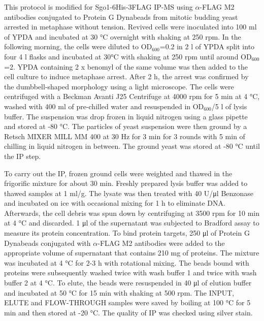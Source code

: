This protocol is modified for Sgo1-6His-3FLAG IP-MS using $\alpha$-FLAG M2 antibodies conjugated to Protein G Dynabeads from mitotic budding yeast arrested in metaphase without tension. Revived cells were inoculated into 100 \si{\milli\litre} of YPDA and incubated at 30 \si{\celsius} overnight with shaking at 250 rpm. In the following morning, the cells were diluted to OD$_{600}$=0.2 in 2 \si{\litre} of YPDA split into four 4 \si{\litre} flasks and incubated at 30\si{\celsius} with shaking at 250 rpm until around OD$_{600}$=2. YPDA containing 2 x benomyl of the same volume was then added to the cell culture to induce metaphase arrest. After 2 \si{\hour}, the arrest was confirmed by the dumbbell-shaped morphology using a light microscope. The cells were centrifuged with a Beckman Avanti J25 Centrifuge at 4000 rpm for 5 \si{\minute} at 4 \si{\celsius}, washed with 400 \si{\milli\litre} of pre-chilled water and resuspended in OD$_{600}$/5 \si{\litre} of lysis buffer. The suspension was drop frozen in liquid nitrogen using a glass pipette and stored at -80 \si{\celsius}. The particles of yeast suspension were then ground by a Retsch MIXER MILL MM 400 at 30 \si{\hertz} for 3 \si{\minute} for 3 rounds with 5 \si{\minute} of chilling in liquid nitrogen in between. The ground yeast was stored at -80 \si{\celsius} until the IP step. 

To carry out the IP, frozen ground cells were weighted and thawed in the frigorific mixture for about 30 \si{\minute}. Freshly prepared lysis buffer was added to thawed samples at 1 \si{\milli\litre/\gram}. The lysate was then treated with 40 U/\si{\micro\litre} Benzonase and incubated on ice with occasional mixing for 1 \si{\hour} to eliminate DNA. Afterwards, the cell debris was spun down by centrifuging at 3500 rpm for 10 \si{\minute} at 4 \si{\celsius} and discarded. 1 \si{\micro\litre} of the supernatant was subjected to Bradford assay to measure its protein concentration. To bind protein targets, 250 \si{\micro\litre} of Protein G Dynabeads conjugated with $\alpha$-FLAG M2 antibodies were added to the appropriate volume of supernatant that contains 210 \si{\milli\gram} of proteins. The mixture was incubated at 4 \si{\celsius} for 2-3 \si{\hour} with rotational mixing. The beads bound with proteins were subsequently washed twice with wash buffer 1 and twice with wash buffer 2 at 4 \si{\celsius}. To elute, the beads were resuspended in 40 \si{\micro\litre} of elution buffer and incubated at 50 \si{\celsius} for 15 \si{\minute} with shaking at 500 rpm. The INPUT, ELUTE and FLOW-THROUGH samples were saved by boiling at 100 \si{\celsius} for 5 \si{\minute} and then stored at -20 \si{\celsius}. The quality of IP was checked using silver stain. 

